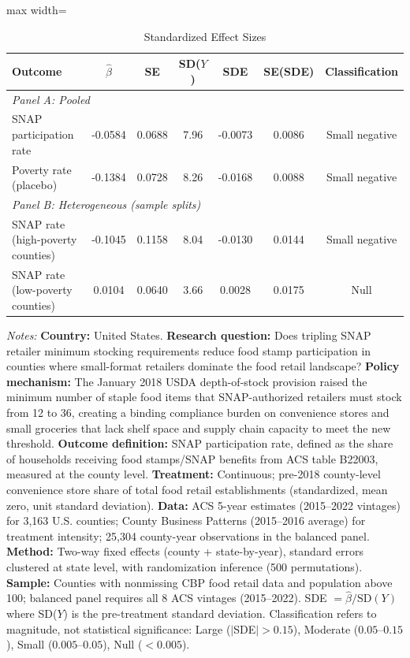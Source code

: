 \begin{table}[htbp]
\centering
\caption{Standardized Effect Sizes}
\label{tab:sde}
\begin{adjustbox}{max width=\textwidth}
\begin{tabular}{lcccccc}
\toprule
Outcome & $\hat{\beta}$ & SE & SD($Y$) & SDE & SE(SDE) & Classification \\
\midrule
\multicolumn{7}{l}{\textit{Panel A: Pooled}} \\
SNAP participation rate & -0.0584 & 0.0688 & 7.96 & -0.0073 & 0.0086 & Small negative \\
Poverty rate (placebo) & -0.1384 & 0.0728 & 8.26 & -0.0168 & 0.0088 & Small negative \\
\midrule
\multicolumn{7}{l}{\textit{Panel B: Heterogeneous (sample splits)}} \\
SNAP rate (high-poverty counties) & -0.1045 & 0.1158 & 8.04 & -0.0130 & 0.0144 & Small negative \\
SNAP rate (low-poverty counties) & 0.0104 & 0.0640 & 3.66 & 0.0028 & 0.0175 & Null \\
\bottomrule
\end{tabular}
\end{adjustbox}
\begin{tablenotes}[flushleft]
\small
\item \textit{Notes:} \textbf{Country:} United States. \textbf{Research question:} Does tripling SNAP retailer minimum stocking requirements reduce food stamp participation in counties where small-format retailers dominate the food retail landscape? \textbf{Policy mechanism:} The January 2018 USDA depth-of-stock provision raised the minimum number of staple food items that SNAP-authorized retailers must stock from 12 to 36, creating a binding compliance burden on convenience stores and small groceries that lack shelf space and supply chain capacity to meet the new threshold. \textbf{Outcome definition:} SNAP participation rate, defined as the share of households receiving food stamps/SNAP benefits from ACS table B22003, measured at the county level. \textbf{Treatment:} Continuous; pre-2018 county-level convenience store share of total food retail establishments (standardized, mean zero, unit standard deviation). \textbf{Data:} ACS 5-year estimates (2015--2022 vintages) for 3,163 U.S. counties; County Business Patterns (2015--2016 average) for treatment intensity; 25,304 county-year observations in the balanced panel. \textbf{Method:} Two-way fixed effects (county + state-by-year), standard errors clustered at state level, with randomization inference (500 permutations). \textbf{Sample:} Counties with nonmissing CBP food retail data and population above 100; balanced panel requires all 8 ACS vintages (2015--2022). SDE $= \hat{\beta} / \text{SD}(Y)$ where SD($Y$) is the pre-treatment standard deviation. Classification refers to magnitude, not statistical significance: Large ($|$SDE$| > 0.15$), Moderate ($0.05$--$0.15$), Small ($0.005$--$0.05$), Null ($< 0.005$).
\end{tablenotes}
\end{table}

